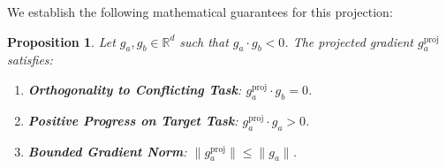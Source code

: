\documentclass{article}
\theoremstyle{plain}
\newtheorem{proposition}[theorem]{Proposition}
\theoremstyle{definition}
\theoremstyle{remark}
\begin{document}
We establish the following mathematical guarantees for this projection:

\begin{proposition}
\label{prop:projection}
Let $g_a, g_b \in \mathbb{R}^d$ such that $g_a \cdot g_b < 0$. The projected gradient $g_a^{\text{proj}}$ satisfies:
\begin{enumerate}
    \item \textbf{Orthogonality to Conflicting Task}: $g_a^{\text{proj}} \cdot g_b = 0$.
    \item \textbf{Positive Progress on Target Task}: $g_a^{\text{proj}} \cdot g_a > 0$.
    \item \textbf{Bounded Gradient Norm}: $\|g_a^{\text{proj}}\| \le \|g_a\|$.
\end{enumerate}
\end{proposition}
\end{document}

